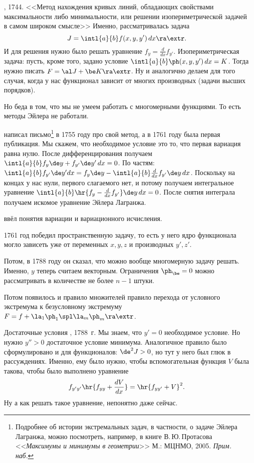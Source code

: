 \documentclass[a4paper,oneside,fleqn,10pt]{article}
\newcommand{\dx}{\,dx}
\begin{document}
, 1744. <<Метод нахождения кривых линий, обладающих свойствами максимальности
либо минимальности, или решении изопериметрической задачей в самом широком смысле>>
Именно, рассматривалась задача
$$J = \intl{a}{b} f(x, y, y')\dx \ra \extr.$$
И для решения нужно было решать уравнение $f_y = \frac{d}{dx} f_{y'}$.
Изопериметрическая задача: пусть, кроме того, задано условие
$\intl{a}{b} \ph(x,y,y')\dx = K$. Тогда нужно писать $F = \al J + \be K \ra \extr$.
Ну и аналогично делаем для того случая, когда у нас функционал зависит от многих производных
(задачи высших порядков).

Но беда в том, что мы не умеем работать с многомерными функциями.
То есть методы Эйлера не работали.

 написал  письмо\footnote{Подробнее об истории экстремальных задач,
в частности, о задаче Эйлера Лагранжа, можно посмотреть, например,
в книге В.\,Ю.\,Протасова <<\emph{Максимумы и минимумы в геометрии}>> М.: МЦНМО, 2005. \emph{Прим. наб.}}
в 1755 году про свой метод, а в 1761 году была первая
публикация. Мы скажем, что необходимое условие это то, что первая вариация
равна нулю. После дифференцирования получаем
$\intl{a}{b} f_y \de y + f_{y'} \de y'\dx = 0$.
По частям:
$\intl{a}{b} f_{y'} \de y'dx = f_y\de y - \intl{a}{b} \frac{d}{dx} f_{y'}\de y \dx$.
Поскольку на концах у нас нули, первого слагаемого нет, и потому получаем интегральное уравнение
$\intl{a}{b} \hr{f_y - \frac{d}{dx} f_{y'} }\de y \dx = 0$.
После снятия интеграла получаем искомое уравнение Эйлера Лагранжа.

 ввёл понятия вариации и вариационного исчисления.

1761 год  победил пространственную задачу, то есть у него ядро функционала
могло зависеть уже от переменных $x,y,z$ и производных $y', z'$.

Потом, в 1788 году он сказал, что можно вообще многомерную задачу решать.
Именно, $y$ теперь считаем векторным. Ограничения $\ph_\be = 0$ можно рассматривать
в количестве не более $n-1$ штуки.

Потом появилось и правило множителей  правило перехода от условного экстремума
к безусловному экстремуму $F = f + \la_1 \ph_1\spl \la_m \ph_m \ra \extr$.

Достаточные условия , 1788~г. Мы знаем, что $y' = 0$ необходимое условие.
Но нужно $y''> 0$ достаточное условие минимума.
Аналогичное правило было сформулировано и для функционалов: $\de^2 J > 0$, но тут у него был глюк
в рассуждениях. Именно, ему было нужно, чтобы вспомогательная функция $V$ была такова, чтобы
было выполнено уравнение
$$f_{y'y'} \hr{f_{yy} + \frac{dV}{dx}} = \hr{f_{yy'} + V}^2.$$
Ну а как решать такое уравнение, непонятно даже сейчас.
\end{document}
